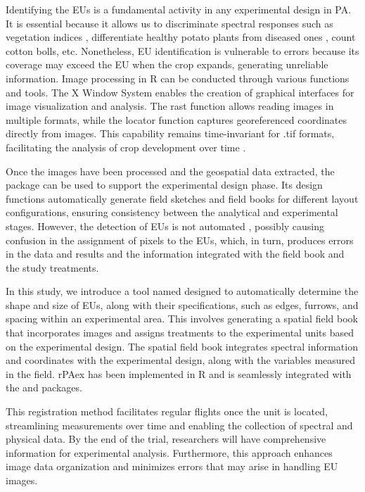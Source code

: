 Identifying the EUs is a fundamental activity in any experimental design in PA. It is essential because it allows us to discriminate spectral responses such as vegetation indices \citep{bendig2015combining}, differentiate healthy potato plants from diseased ones \citep{griffel2018using}, count cotton bolls\citep{jung2018unmanned}, etc. Nonetheless, EU identification is vulnerable to errors because its coverage may exceed the EU when the crop expands, generating unreliable information. Image processing in R can be conducted through various functions and tools. The X Window System enables the creation of graphical interfaces for image visualization and analysis. The rast function \citep{terra2023} allows reading images in multiple formats, while the locator function captures georeferenced coordinates directly from images. This capability remains time-invariant for .tif formats, facilitating the analysis of crop development over time \citep{lee2020intra}.

Once the images have been processed and the geospatial data extracted, the  package can be used to support the experimental design phase. Its design functions automatically generate field sketches and field books for different layout configurations, ensuring consistency between the analytical and experimental stages. However, the detection of EUs is not automated \citep{bendig2015combining}, possibly causing confusion in the assignment of pixels to the EUs, which, in turn, produces errors in the data and results and the information integrated with the field book and the study treatments.

In this study, we introduce a tool named  designed to automatically determine the shape and size of EUs, along with their specifications, such as edges, furrows, and spacing within an experimental area. This involves generating a spatial field book that incorporates images and assigns treatments to the experimental units based on the experimental design. The spatial field book integrates spectral information and coordinates with the experimental design, along with the variables measured in the field. rPAex has been implemented in R and is seamlessly integrated with the  and  packages.

This registration method facilitates regular flights once the unit is located, streamlining measurements over time and enabling the collection of spectral and physical data. By the end of the trial, researchers will have comprehensive information for experimental analysis. Furthermore, this approach enhances image data organization and minimizes errors that may arise in handling EU images.

